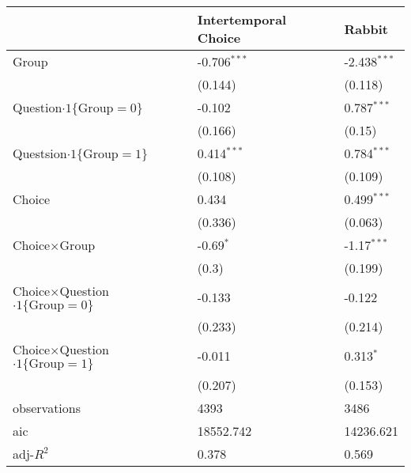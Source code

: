 \begin{tabular}{lll}
\hline
 & Intertemporal Choice & Rabbit \\
\hline
Group & -0.706$^{***}$ & -2.438$^{***}$ \\
 & (0.144) & (0.118) \\
Question$\cdot1\{\text{Group}=0\}$ & -0.102 & 0.787$^{***}$ \\
 & (0.166) & (0.15) \\
Questsion$\cdot1\{\text{Group}=1\}$ & 0.414$^{***}$ & 0.784$^{***}$ \\
 & (0.108) & (0.109) \\
Choice & 0.434 & 0.499$^{***}$ \\
 & (0.336) & (0.063) \\
Choice$\times$Group & -0.69$^{*}$ & -1.17$^{***}$ \\
 & (0.3) & (0.199) \\
Choice$\times$Question$\cdot1\{\text{Group}=0\}$ & -0.133 & -0.122 \\
 & (0.233) & (0.214) \\
Choice$\times$Question$\cdot1\{\text{Group}=1\}$ & -0.011 & 0.313$^{*}$ \\
 & (0.207) & (0.153) \\\hline

observations & 4393 & 3486 \\
aic & 18552.742 & 14236.621 \\
adj-$R^2$ & 0.378 & 0.569 \\
\hline
\end{tabular}
